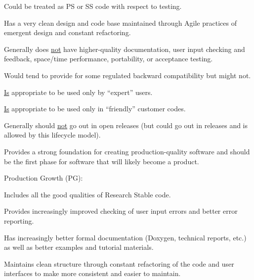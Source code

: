\documentclass[11pt]{SANDreport}
\begin{document}
\begin{compactenum}
\begin{compactitem}
{}\item Could be treated as PS or SS code with respect to testing.

{}\item Has a very clean design and code base maintained through Agile
practices of emergent design and constant refactoring.

{}\item Generally does {}\underline{not} have higher-quality
documentation, user input checking and feedback, space/time
performance, portability, or acceptance testing.

{}\item Would tend to provide for some regulated backward
compatibility but might not.

{}\item {}\underline{Is} appropriate to be used only by ``expert''
users.

{}\item {}\underline{Is} appropriate to be used only in ``friendly''
customer codes.

{}\item Generally should {}\underline{not} go out in open releases
(but could go out in releases and is allowed by this lifecycle model).

{}\item Provides a strong foundation for creating production-quality
software and should be the first phase for software that will likely
become a product.

\end{compactitem}

{}\item Production Growth (PG):

\begin{compactitem}

{}\item Includes all the good qualities of Research Stable code.

{}\item Provides increasingly improved checking of user input errors
and better error reporting.

{}\item Has increasingly better formal documentation (Doxygen,
technical reports, etc.) as well as better examples and tutorial
materials.

{}\item Maintains clean structure through constant refactoring of the
code and user interfaces to make more consistent and easier to
maintain.


\end{compactitem}
\end{compactenum}
\end{document}
